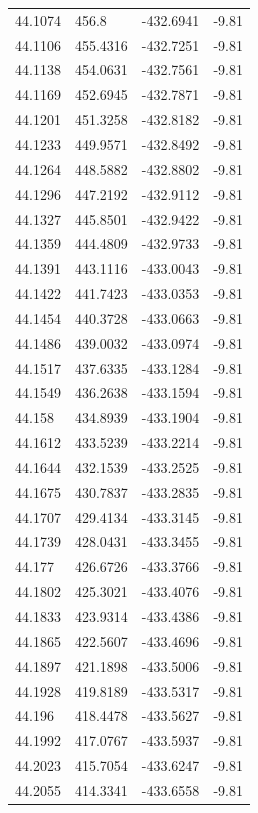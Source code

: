 \begin{table}[H]
\begin{tabular}{llll}
44.1074 & 456.8 & -432.6941 & -9.81 \\
44.1106 & 455.4316 & -432.7251 & -9.81 \\
44.1138 & 454.0631 & -432.7561 & -9.81 \\
44.1169 & 452.6945 & -432.7871 & -9.81 \\
44.1201 & 451.3258 & -432.8182 & -9.81 \\
44.1233 & 449.9571 & -432.8492 & -9.81 \\
44.1264 & 448.5882 & -432.8802 & -9.81 \\
44.1296 & 447.2192 & -432.9112 & -9.81 \\
44.1327 & 445.8501 & -432.9422 & -9.81 \\
44.1359 & 444.4809 & -432.9733 & -9.81 \\
44.1391 & 443.1116 & -433.0043 & -9.81 \\
44.1422 & 441.7423 & -433.0353 & -9.81 \\
44.1454 & 440.3728 & -433.0663 & -9.81 \\
44.1486 & 439.0032 & -433.0974 & -9.81 \\
44.1517 & 437.6335 & -433.1284 & -9.81 \\
44.1549 & 436.2638 & -433.1594 & -9.81 \\
44.158 & 434.8939 & -433.1904 & -9.81 \\
44.1612 & 433.5239 & -433.2214 & -9.81 \\
44.1644 & 432.1539 & -433.2525 & -9.81 \\
44.1675 & 430.7837 & -433.2835 & -9.81 \\
44.1707 & 429.4134 & -433.3145 & -9.81 \\
44.1739 & 428.0431 & -433.3455 & -9.81 \\
44.177 & 426.6726 & -433.3766 & -9.81 \\
44.1802 & 425.3021 & -433.4076 & -9.81 \\
44.1833 & 423.9314 & -433.4386 & -9.81 \\
44.1865 & 422.5607 & -433.4696 & -9.81 \\
44.1897 & 421.1898 & -433.5006 & -9.81 \\
44.1928 & 419.8189 & -433.5317 & -9.81 \\
44.196 & 418.4478 & -433.5627 & -9.81 \\
44.1992 & 417.0767 & -433.5937 & -9.81 \\
44.2023 & 415.7054 & -433.6247 & -9.81 \\
44.2055 & 414.3341 & -433.6558 & -9.81 \\

\end{tabular}
\end{table}

